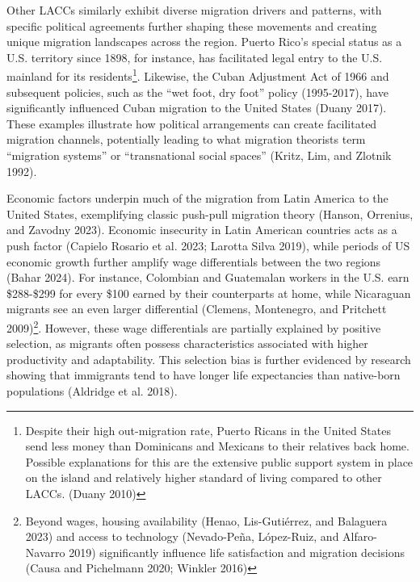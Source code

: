 \documentclass[
]{article}
\begin{document}
Other LACCs similarly exhibit diverse migration drivers and patterns,
with specific political agreements further shaping these movements and
creating unique migration landscapes across the region. Puerto Rico's
special status as a U.S. territory since 1898, for instance, has
facilitated legal entry to the U.S. mainland for its
residents\footnote{Despite their high out-migration rate, Puerto Ricans
  in the United States send less money than Dominicans and Mexicans to
  their relatives back home. Possible explanations for this are the
  extensive public support system in place on the island and relatively
  higher standard of living compared to other LACCs. (Duany 2010)}.
Likewise, the Cuban Adjustment Act of 1966 and subsequent policies, such
as the ``wet foot, dry foot'' policy (1995-2017), have significantly
influenced Cuban migration to the United States (Duany 2017). These
examples illustrate how political arrangements can create facilitated
migration channels, potentially leading to what migration theorists term
``migration systems'' or ``transnational social spaces'' (Kritz, Lim,
and Zlotnik 1992).

Economic factors underpin much of the migration from Latin America to
the United States, exemplifying classic push-pull migration theory
(Hanson, Orrenius, and Zavodny 2023). Economic insecurity in Latin
American countries acts as a push factor (Capielo Rosario et al. 2023;
Larotta Silva 2019), while periods of US economic growth further amplify
wage differentials between the two regions (Bahar 2024). For instance,
Colombian and Guatemalan workers in the U.S. earn \$288-\$299 for every
\$100 earned by their counterparts at home, while Nicaraguan migrants
see an even larger differential (Clemens, Montenegro, and Pritchett
2009)\footnote{Beyond wages, housing availability (Henao, Lis-Gutiérrez,
  and Balaguera 2023) and access to technology (Nevado-Peña, López-Ruiz,
  and Alfaro-Navarro 2019) significantly influence life satisfaction and
  migration decisions (Causa and Pichelmann 2020; Winkler 2016)}.
However, these wage differentials are partially explained by positive
selection, as migrants often possess characteristics associated with
higher productivity and adaptability. This selection bias is further
evidenced by research showing that immigrants tend to have longer life
expectancies than native-born populations (Aldridge et al. 2018).
\end{document}
